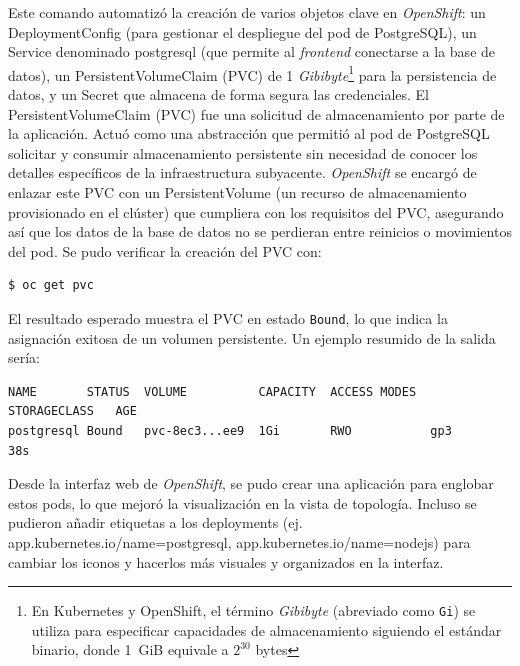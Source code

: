     Este comando automatizó la creación de varios objetos clave en \textit{OpenShift}: un DeploymentConfig (para gestionar el despliegue del pod de PostgreSQL), un Service denominado postgresql (que permite al \textit{frontend} conectarse a la base de datos), un PersistentVolumeClaim (PVC) de 1 \textit{Gibibyte}\footnote{En Kubernetes y OpenShift, el término \textit{Gibibyte} (abreviado como \texttt{Gi}) se utiliza para especificar capacidades de almacenamiento siguiendo el estándar binario, donde 1~GiB equivale a $2^{30}$ bytes} para la persistencia de datos, y un Secret que almacena de forma segura las credenciales.
    El PersistentVolumeClaim (PVC) fue una solicitud de almacenamiento por parte de la aplicación. Actuó como una abstracción que permitió al pod de PostgreSQL solicitar y consumir almacenamiento persistente sin necesidad de conocer los detalles específicos de la infraestructura subyacente. \textit{OpenShift} se encargó de enlazar este PVC con un PersistentVolume (un recurso de almacenamiento provisionado en el clúster) que cumpliera con los requisitos del PVC, asegurando así que los datos de la base de datos no se perdieran entre reinicios o movimientos del pod.
    Se pudo verificar la creación del PVC con:
    \begin{verbatim}
$ oc get pvc
    \end{verbatim}

    El resultado esperado muestra el PVC en estado \texttt{Bound}, lo que indica la asignación exitosa de un volumen persistente. Un ejemplo resumido de la salida sería:

    \begin{verbatim}
NAME       STATUS  VOLUME          CAPACITY  ACCESS MODES  STORAGECLASS   AGE
postgresql Bound   pvc-8ec3...ee9  1Gi       RWO           gp3            38s
    \end{verbatim}


    Desde la interfaz web de \textit{OpenShift}, se pudo crear una aplicación para englobar estos pods, lo que mejoró la visualización en la vista de topología. Incluso se pudieron añadir etiquetas a los deployments (ej. app.kubernetes.io/name=postgresql,
     app.kubernetes.io/name=nodejs) para cambiar los iconos y hacerlos más visuales y organizados en la interfaz.

